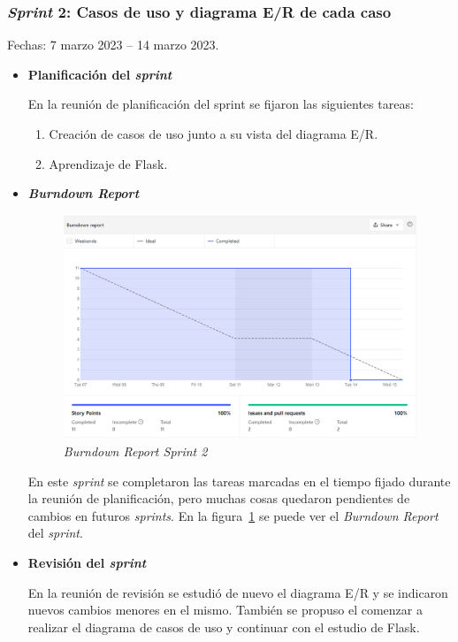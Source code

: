 \subsubsection{\textit{Sprint} 2: Casos de uso y diagrama E/R de cada caso}
Fechas: 7 marzo 2023 -- 14 marzo 2023.
\begin{itemize}
\item\textbf{Planificación del \textit{sprint}}

En la reunión de planificación del sprint se fijaron las siguientes tareas:
\begin{enumerate}
	\item Creación de casos de uso junto a su vista del diagrama E/R.
	\item Aprendizaje de Flask.
\end{enumerate}

\item\textbf{\textit{Burndown Report}}

\begin{figure}
	\centering
	\includegraphics[width=\textwidth]{../img/Anexos/Sprints/Sprint2.png}
	\caption{\textit{Burndown Report Sprint 2}}\label{ReportSprint2}
\end{figure}

En este \textit{sprint} se completaron las tareas marcadas en el tiempo fijado durante la reunión de planificación, pero muchas cosas quedaron pendientes de cambios en futuros \textit{sprints}. En la figura~\ref{ReportSprint2} se puede ver el \textit{Burndown Report} del \textit{sprint}.

\item\textbf{Revisión del \textit{sprint}}

En la reunión de revisión se estudió de nuevo el diagrama E/R y se indicaron nuevos cambios menores en el mismo. También se propuso el comenzar a realizar el diagrama de casos de uso y continuar con el estudio de Flask.
\end{itemize}

